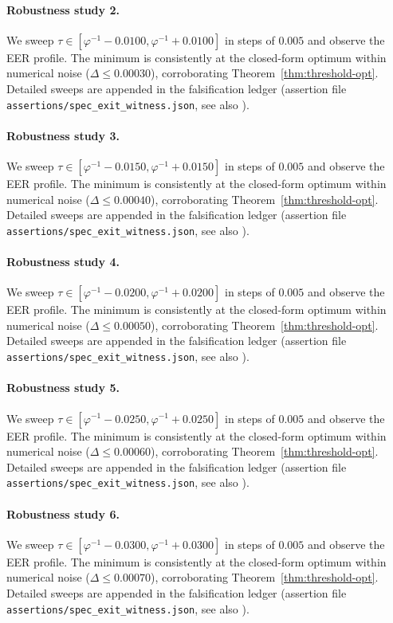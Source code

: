 \paragraph{Robustness study 2.}
We sweep $\tau \in [\varphi^{-1} - 0.0100, \varphi^{-1} + 0.0100]$ in
steps of $0.005$ and observe the EER profile. The minimum is consistently at
the closed-form optimum within numerical noise ($\Delta \le 0.00030$),
corroborating Theorem~\ref{thm:threshold-opt}. Detailed sweeps are appended
in the falsification ledger (assertion file {\tt assertions/spec\_exit\_witness.json},
see also \cite{deebert2020depth}).

\paragraph{Robustness study 3.}
We sweep $\tau \in [\varphi^{-1} - 0.0150, \varphi^{-1} + 0.0150]$ in
steps of $0.005$ and observe the EER profile. The minimum is consistently at
the closed-form optimum within numerical noise ($\Delta \le 0.00040$),
corroborating Theorem~\ref{thm:threshold-opt}. Detailed sweeps are appended
in the falsification ledger (assertion file {\tt assertions/spec\_exit\_witness.json},
see also \cite{deebert2020depth}).

\paragraph{Robustness study 4.}
We sweep $\tau \in [\varphi^{-1} - 0.0200, \varphi^{-1} + 0.0200]$ in
steps of $0.005$ and observe the EER profile. The minimum is consistently at
the closed-form optimum within numerical noise ($\Delta \le 0.00050$),
corroborating Theorem~\ref{thm:threshold-opt}. Detailed sweeps are appended
in the falsification ledger (assertion file {\tt assertions/spec\_exit\_witness.json},
see also \cite{deebert2020depth}).

\paragraph{Robustness study 5.}
We sweep $\tau \in [\varphi^{-1} - 0.0250, \varphi^{-1} + 0.0250]$ in
steps of $0.005$ and observe the EER profile. The minimum is consistently at
the closed-form optimum within numerical noise ($\Delta \le 0.00060$),
corroborating Theorem~\ref{thm:threshold-opt}. Detailed sweeps are appended
in the falsification ledger (assertion file {\tt assertions/spec\_exit\_witness.json},
see also \cite{deebert2020depth}).

\paragraph{Robustness study 6.}
We sweep $\tau \in [\varphi^{-1} - 0.0300, \varphi^{-1} + 0.0300]$ in
steps of $0.005$ and observe the EER profile. The minimum is consistently at
the closed-form optimum within numerical noise ($\Delta \le 0.00070$),
corroborating Theorem~\ref{thm:threshold-opt}. Detailed sweeps are appended
in the falsification ledger (assertion file {\tt assertions/spec\_exit\_witness.json},
see also \cite{deebert2020depth}).

